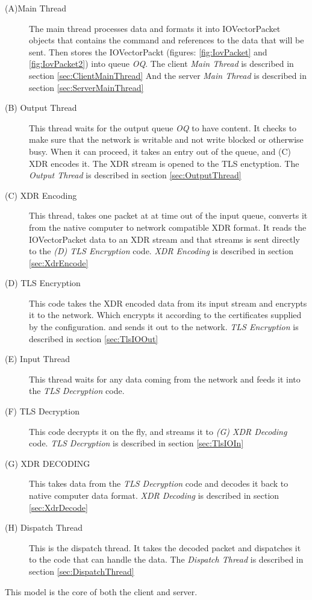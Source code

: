 \begin{description}
\item[(A)Main Thread]\label{item:MainThread}
	The main thread processes data and formats it into
  IOVectorPacket objects that contains the command
  and references to the data that will be sent.
  Then stores the IOVectorPackt (figures: \ref{fig:IovPacket} and \ref{fig:IovPacket2})
  into queue \textit{OQ}.
  The client \textit{Main Thread} is described in section \ref{sec:ClientMainThread}
  And the server \textit{Main Thread} is described in section \ref{sec:ServerMainThread}

\item[(B) Output Thread]
  This thread waits for the output queue \textit{OQ} to have
  content.
  It checks to make sure that the network is writable and not write blocked
  or otherwise busy.
  When it can proceed, it takes an entry out of the queue,
  and (C) XDR encodes it.
  The XDR stream is opened to the TLS enctyption.
  The \textit{Output Thread} is described in section \ref{sec:OutputThread}
  
\item[(C) XDR Encoding]\label{item:XdrEncodingThread}
	This thread, takes one packet at at time
	out of the input queue,	converts it from the native computer
  to network compatible XDR format.
  It reads the IOVectorPacket data to an XDR stream and that streams is sent directly
  to the \textit{(D) TLS Encryption} code.
  \textit{XDR Encoding} is described in section \ref{sec:XdrEncode}

\item[(D) TLS Encryption]\label{item:TlsEncryption}
  This code takes the XDR encoded data from its input stream
  and encrypts it to the network.
  Which encrypts it according to the certificates supplied by the configuration.
  and sends it out to the network.
  \textit{TLS Encryption} is described in section \ref{sec:TlsIOOut}

\item[(E) Input Thread]\label{item:InputThread}
  This thread waits for any data coming from the network
  and feeds it into the \textit{TLS Decryption} code.
    
\item[(F) TLS Decryption]\label{item:TlsDecryptionThread}
  This code decrypts it on the fly, and streams it to \textit{(G) XDR Decoding} code.
  \textit{TLS Decryption} is described in section \ref{sec:TlsIOIn}

\item[(G) XDR DECODING]\label{item:XdrDecoding}
  This takes data from the \textit{TLS Decryption} code and decodes
  it back to native computer data format.
  \textit{XDR Decoding} is described in section \ref{sec:XdrDecode}
  
\item[(H) Dispatch Thread]\label{DispatchThread}
	This is the dispatch thread.
  It takes the decoded packet and dispatches it to the code that can handle the data.
  The \textit{Dispatch Thread} is described in section \ref{sec:DispatchThread}

\end{description}


This model is the core of both the client and server.

